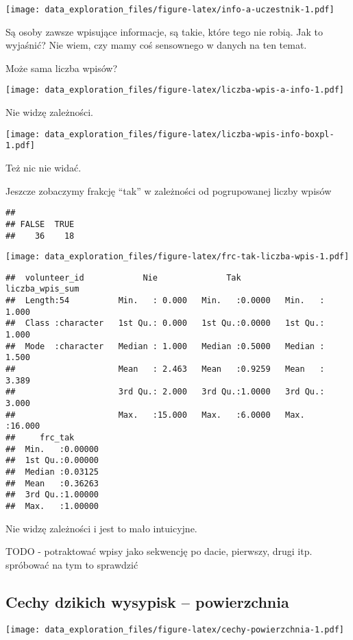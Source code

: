 \documentclass[
]{article}
\begin{document}
\texttt{[image: data\_exploration\_files/figure-latex/info-a-uczestnik-1.pdf]}

Są osoby zawsze wpisujące informacje, są takie, które tego nie robią.
Jak to wyjaśnić? Nie wiem, czy mamy coś sensownego w danych na ten
temat.

Może sama liczba wpisów?

\texttt{[image: data\_exploration\_files/figure-latex/liczba-wpis-a-info-1.pdf]}

Nie widzę zależności.

\texttt{[image: data\_exploration\_files/figure-latex/liczba-wpis-info-boxpl-1.pdf]}

Też nic nie widać.

Jeszcze zobaczymy frakcję ``tak'' w zależności od pogrupowanej liczby
wpisów

\begin{verbatim}
## 
## FALSE  TRUE 
##    36    18
\end{verbatim}

\texttt{[image: data\_exploration\_files/figure-latex/frc-tak-liczba-wpis-1.pdf]}

\begin{verbatim}
##  volunteer_id            Nie              Tak         liczba_wpis_sum 
##  Length:54          Min.   : 0.000   Min.   :0.0000   Min.   : 1.000  
##  Class :character   1st Qu.: 0.000   1st Qu.:0.0000   1st Qu.: 1.000  
##  Mode  :character   Median : 1.000   Median :0.5000   Median : 1.500  
##                     Mean   : 2.463   Mean   :0.9259   Mean   : 3.389  
##                     3rd Qu.: 2.000   3rd Qu.:1.0000   3rd Qu.: 3.000  
##                     Max.   :15.000   Max.   :6.0000   Max.   :16.000  
##     frc_tak       
##  Min.   :0.00000  
##  1st Qu.:0.00000  
##  Median :0.03125  
##  Mean   :0.36263  
##  3rd Qu.:1.00000  
##  Max.   :1.00000
\end{verbatim}

Nie widzę zależności i jest to mało intuicyjne.

TODO - potraktować wpisy jako sekwencję po dacie, pierwszy, drugi itp.
spróbować na tym to sprawdzić

\hypertarget{cechy-dzikich-wysypisk-powierzchnia}{%
\subsection{Cechy dzikich wysypisk --
powierzchnia}\label{cechy-dzikich-wysypisk-powierzchnia}}

\texttt{[image: data\_exploration\_files/figure-latex/cechy-powierzchnia-1.pdf]}
\end{document}
